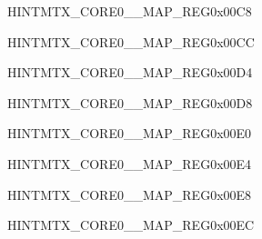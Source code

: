 \begin{register}{H}{INTMTX\_CORE0\_\_MAP\_REG}{0x00C8}\label{regdesc:INTMTXCORE0I2CEXT0INTRMAPREG}
\end{register}\vspace{-3em}




\begin{register}{H}{INTMTX\_CORE0\_\_MAP\_REG}{0x00CC}\label{regdesc:INTMTXCORE0TG0T0INTRMAPREG}
\end{register}\vspace{-3em}




\begin{register}{H}{INTMTX\_CORE0\_\_MAP\_REG}{0x00D4}\label{regdesc:INTMTXCORE0TG0WDTINTRMAPREG}
\end{register}\vspace{-3em}


\begin{register}{H}{INTMTX\_CORE0\_\_MAP\_REG}{0x00D8}\label{regdesc:INTMTXCORE0TG1T0INTRMAPREG}
\end{register}\vspace{-3em}




\begin{register}{H}{INTMTX\_CORE0\_\_MAP\_REG}{0x00E0}\label{regdesc:INTMTXCORE0TG1WDTINTRMAPREG}
\end{register}\vspace{-3em}


\begin{register}{H}{INTMTX\_CORE0\_\_MAP\_REG}{0x00E4}\label{regdesc:INTMTXCORE0SYSTIMERTARGET0INTRMAPREG}
\end{register}\vspace{-3em}


\begin{register}{H}{INTMTX\_CORE0\_\_MAP\_REG}{0x00E8}\label{regdesc:INTMTXCORE0SYSTIMERTARGET1INTRMAPREG}
\end{register}\vspace{-3em}


\begin{register}{H}{INTMTX\_CORE0\_\_MAP\_REG}{0x00EC}\label{regdesc:INTMTXCORE0SYSTIMERTARGET2INTRMAPREG}
\end{register}\vspace{-3em}


